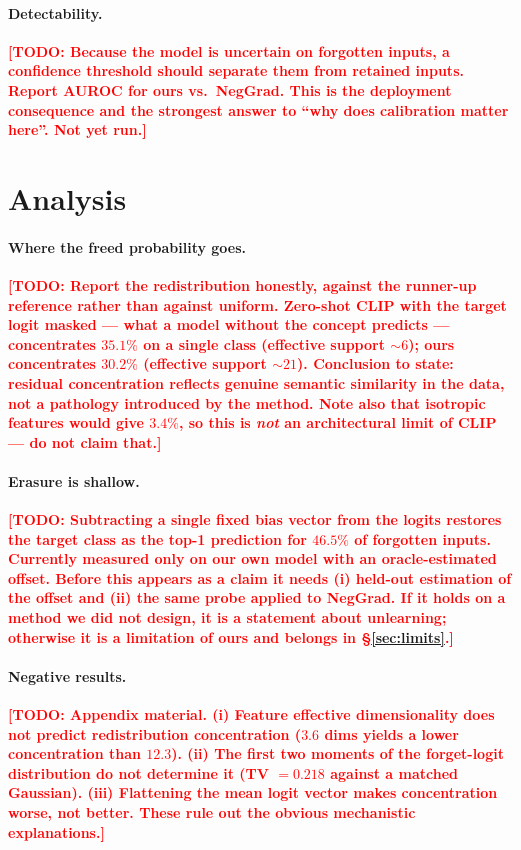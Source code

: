 \documentclass[10pt]{article}
\newcommand{\todo}[1]{\textcolor{red}{\textbf{[TODO: #1]}}}
\begin{document}
\paragraph{Detectability.} \todo{Because the model is uncertain on forgotten
inputs, a confidence threshold should separate them from retained inputs. Report
AUROC for ours vs.\ NegGrad. This is the deployment consequence and the strongest
answer to ``why does calibration matter here''. Not yet run.}

\section{Analysis}
\label{sec:analysis}

\paragraph{Where the freed probability goes.}
\todo{Report the redistribution honestly, against the runner-up reference rather
than against uniform. Zero-shot CLIP with the target logit masked --- what a
model without the concept predicts --- concentrates $35.1\%$ on a single class
(effective support $\sim 6$); ours concentrates $30.2\%$ (effective
support $\sim 21$). Conclusion to state: residual concentration reflects genuine
semantic similarity in the data, not a pathology introduced by the method.
Note also that isotropic features would give $3.4\%$, so this is \emph{not} an
architectural limit of CLIP --- do not claim that.}

\paragraph{Erasure is shallow.}
\todo{Subtracting a single fixed bias vector from the logits restores the target
class as the top-1 prediction for $46.5\%$ of forgotten inputs. Currently
measured only on our own model with an oracle-estimated offset. Before this
appears as a claim it needs (i) held-out estimation of the offset and (ii) the
same probe applied to NegGrad. If it holds on a method we did not design, it is a
statement about unlearning; otherwise it is a limitation of ours and belongs in
\S\ref{sec:limits}.}

\paragraph{Negative results.}
\todo{Appendix material. (i) Feature effective dimensionality does not predict
redistribution concentration ($3.6$ dims yields a lower concentration than
$12.3$). (ii) The first two moments of the forget-logit distribution do not
determine it (TV $=0.218$ against a matched Gaussian). (iii) Flattening the mean
logit vector makes concentration worse, not better. These rule out the obvious
mechanistic explanations.}
\end{document}
